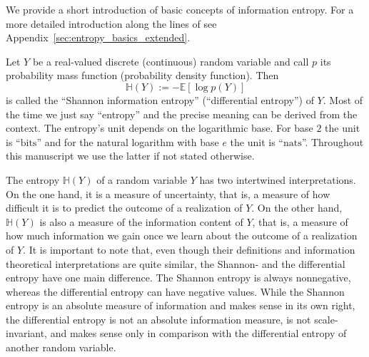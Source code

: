 \documentclass[smallextended]{svjour3}
\newcommand{\E}{\mathbb{E}}
\renewcommand{\H}{\mathbb{H}}
\newcommand{\bits}{\mathrm{bits}}
\newcommand{\nats}{\mathrm{nats}}
\newcommand{\ie}{that is}
\newcommand{\pdf}{probability density function}
\renewcommand{\emph}[1]{``#1''}
\begin{document}
We provide a short introduction of basic concepts of information entropy.
For a more detailed introduction along the lines of \citet{Cover2006} see Appendix~\ref{sec:entropy_basics_extended}.

Let $Y$ be a real-valued discrete (continuous) random variable and call $p$ its probability mass function (\pdf).
Then
\begin{equation}
  \H(Y) := -\E\left[\log p(Y)\right]
\end{equation}
is called the \emph{Shannon information entropy} (\emph{differential entropy}) of $Y$.
Most of the time we just say \emph{entropy} and the precise meaning can be derived from the context.
The entropy's unit depends on the logarithmic base.
For base $2$ the unit is \emph{$\bits$} and for the natural logarithm with base $e$ the unit is \emph{$\nats$}.
Throughout this manuscript we use the latter if not stated otherwise.

The entropy $\H(Y)$ of a random variable $Y$ has two intertwined interpretations.
On the one hand, it is a measure of uncertainty, \ie, a measure of how difficult it is to predict the outcome of a realization of $Y$.
On the other hand, $\H(Y)$ is also a measure of the information content of $Y$, \ie, a measure of how much information we gain once we learn about the outcome of a realization of $Y$.
It is important to note that, even though their definitions and information theoretical interpretations are quite similar, the Shannon- and the differential entropy have one main difference.
The Shannon entropy is always nonnegative, whereas the differential entropy can have negative values.
While the Shannon entropy is an absolute measure of information and makes sense in its own right, the differential entropy is not an absolute information measure, is not scale-invariant, and makes sense only in comparison with the differential entropy of another random variable.
\end{document}

